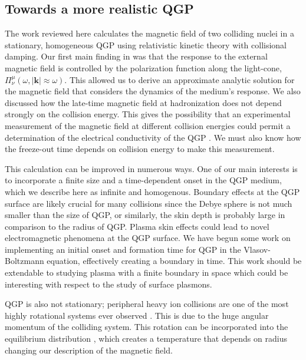 
\subsection{Towards a more realistic QGP }\label{sec:ConclusionsQGP}
The work reviewed here calculates the magnetic field of two colliding nuclei in a stationary, homogeneous QGP using relativistic kinetic theory with collisional damping. Our first main finding in \cite{Grayson:2022asf} was that the response to the external magnetic field is controlled by the polarization function along the light-cone, $\Pi^\mu_\nu(\omega ,|\boldsymbol{k}|\approx\omega)$. This allowed us to derive an approximate analytic solution for the magnetic field that considers the dynamics of the medium's response. We also discussed how the late-time magnetic field at hadronization does not depend strongly on the collision energy. This gives the possibility that an experimental measurement of the magnetic field at different collision energies could permit a determination of the electrical conductivity of the QGP \cite{STAR:2023jdd}. We must also know how the freeze-out time depends on collision energy to make this measurement.

This calculation can be improved in numerous ways. One of our main interests is to incorporate a finite size and a time-dependent onset in the QGP medium, which we describe here as infinite and homogenous. Boundary effects at the QGP surface are likely crucial for many collisions since the Debye sphere is not much smaller than the size of QGP, or similarly, the skin depth is probably large in comparison to the radius of QGP. Plasma skin effects could lead to novel electromagnetic phenomena at the QGP surface. We have begun some work on implementing an initial onset and formation time for QGP in the Vlasov-Boltzmann equation, effectively creating a boundary in time. This work should be extendable to studying plasma with a finite boundary in space which could be interesting with respect to the study of surface plasmons.

QGP is also not stationary; peripheral heavy ion collisions are one of the most highly rotational systems ever observed \cite{Csernai:2013bq,Deng:2016vhi,Jiang:2016woz,Becattini:2020pvq}. This is due to the huge angular momentum of the colliding system. This rotation can be incorporated into the equilibrium distribution \cite{Hakim:2011bk}, which creates a temperature that depends on radius \cite{Chernikov:1964edr} changing our description of the magnetic field.

